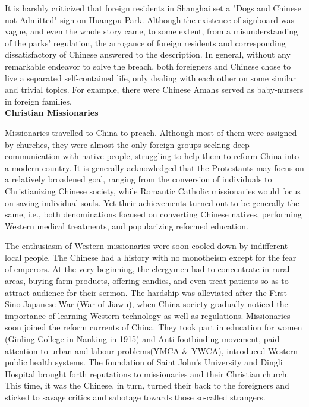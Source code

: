 \documentclass[11pt]{article}
\begin{document}
\begin{spacing}{2.0}
It is harshly criticized that foreign residents in Shanghai set a "Dogs and Chinese not Admitted" sign on Huangpu Park. Although the existence of signboard was vague, and even the whole story came, to some extent, from a misunderstanding of the parks' regulation, the arrogance of foreign residents and corresponding dissatisfactory of Chinese answered to the description\autocite{Dogs-and-Chinese-not-Admitted}. In general, without any remarkable endeavor to solve the breach, both foreigners and Chinese chose to live a separated self-contained life, only dealing with each other on some similar and trivial topics. For example, there were Chinese Amahs served as baby-nursers in foreign families.\autocite{Out-of-China}
\\
\textbf{Christian Missionaries}

Missionaries travelled to China to preach. Although most of them were assigned by churches, they were almost the only foreign groups seeking deep communication with native people, struggling to help them to reform China into a modern country. It is generally acknowledged that the Protestants may focus on a relatively broadened goal, ranging from the conversion of individuals to Christianizing Chinese society, while Romantic Catholic missionaries would focus on saving individual souls. Yet their achievements turned out to be generally the same, i.e., both denominations focused on converting Chinese natives, performing Western medical treatments, and popularizing reformed education.

The enthusiasm of Western missionaries were soon cooled down by indifferent local people. The Chinese had a history with no monotheism except for the fear of emperors. At the very beginning, the clergymen had to concentrate in rural areas, buying farm products, offering candies, and even treat patients so as to attract audience for their sermon\autocite{finding-missionaries}.
The hardship was alleviated after the First Sino-Japanese War (War of Jiawu), when China society gradually noticed the importance of learning Western technology as well as regulations. Missionaries soon joined the reform currents of China. They took part in education for women (Ginling College in Nanking in 1915) and Anti-footbinding movement, paid attention to urban and labour problems(YMCA $\&$ YWCA), introduced Western public health systems. The foundation of Saint John's University and Dingli Hospital brought forth reputations to missionaries and their Christian church. This time, it was the Chinese, in turn, turned their back to the foreigners and sticked to savage critics and sabotage towards those so-called strangers.


\end{spacing}
\end{document}
